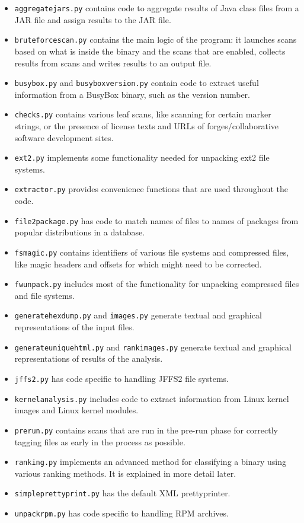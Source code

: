 \documentclass[10pt]{article}
\begin{document}
\begin{itemize}
\item \texttt{aggregatejars.py} contains code to aggregate results of Java
class files from a JAR file and assign results to the JAR file.
\item \texttt{bruteforcescan.py} contains the main logic of the program: it
launches scans based on what is inside the binary and the scans that are
enabled, collects results from scans and writes results to an output file.
\item \texttt{busybox.py} and \texttt{busyboxversion.py} contain code to
extract useful information from a BusyBox binary, such as the version number.
\item \texttt{checks.py} contains various leaf scans, like scanning for certain
marker strings, or the presence of license texts and URLs of
forges/collaborative software development sites.
\item \texttt{ext2.py} implements some functionality needed for unpacking ext2
file systems.
\item \texttt{extractor.py} provides convenience functions that are used
throughout the code.
\item \texttt{file2package.py} has code to match names of files to names of
packages from popular distributions in a database.
\item \texttt{fsmagic.py} contains identifiers of various file systems and
compressed files, like magic headers and offsets for which might need to be
corrected.
\item \texttt{fwunpack.py} includes most of the functionality for unpacking
compressed files and file systems.
\item \texttt{generatehexdump.py} and \texttt{images.py} generate textual and
graphical representations of the input files.
\item \texttt{generateuniquehtml.py} and \texttt{rankimages.py} generate
textual and graphical representations of results of the analysis.
\item \texttt{jffs2.py} has code specific to handling JFFS2 file systems.
\item \texttt{kernelanalysis.py} includes code to extract information from
Linux kernel images and Linux kernel modules.
\item \texttt{prerun.py} contains scans that are run in the pre-run phase for
correctly tagging files as early in the process as possible.
\item \texttt{ranking.py} implements an advanced method for classifying a
binary using various ranking methods. It is explained in more detail later.
\item \texttt{simpleprettyprint.py} has the default XML prettyprinter.
\item \texttt{unpackrpm.py} has code specific to handling RPM archives.
\end{itemize}
\end{document}
